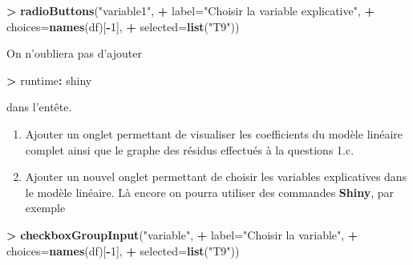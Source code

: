 \documentclass[]{book}
\newenvironment{Shaded}{\begin{snugshade}}{\end{snugshade}}
\newcommand{\DataTypeTok}[1]{\textcolor[rgb]{0.13,0.29,0.53}{#1}}
\newcommand{\DecValTok}[1]{\textcolor[rgb]{0.00,0.00,0.81}{#1}}
\newcommand{\KeywordTok}[1]{\textcolor[rgb]{0.13,0.29,0.53}{\textbf{#1}}}
\newcommand{\NormalTok}[1]{#1}
\newcommand{\OperatorTok}[1]{\textcolor[rgb]{0.81,0.36,0.00}{\textbf{#1}}}
\newcommand{\StringTok}[1]{\textcolor[rgb]{0.31,0.60,0.02}{#1}}
\providecommand{\tightlist}{%
  \setlength{\itemsep}{0pt}\setlength{\parskip}{0pt}}
\theoremstyle{definition}
\theoremstyle{definition}
\theoremstyle{definition}
\theoremstyle{remark}
\begin{document}
\begin{Shaded}
\begin{Highlighting}[]
\OperatorTok{>}\StringTok{ }\KeywordTok{radioButtons}\NormalTok{(}\StringTok{"variable1"}\NormalTok{,}
\OperatorTok{+}\StringTok{                    }\DataTypeTok{label=}\StringTok{"Choisir la variable explicative"}\NormalTok{,}
\OperatorTok{+}\StringTok{                    }\DataTypeTok{choices=}\KeywordTok{names}\NormalTok{(df)[}\OperatorTok{-}\DecValTok{1}\NormalTok{],}
\OperatorTok{+}\StringTok{                    }\DataTypeTok{selected=}\KeywordTok{list}\NormalTok{(}\StringTok{"T9"}\NormalTok{))}
\end{Highlighting}
\end{Shaded}

On n'oubliera pas d'ajouter

\begin{Shaded}
\begin{Highlighting}[]
\OperatorTok{>}\StringTok{ }\NormalTok{runtime}\OperatorTok{:}\StringTok{ }\NormalTok{shiny}
\end{Highlighting}
\end{Shaded}

dans l'entête.

\begin{enumerate}
\def\labelenumi{\alph{enumi}.}
\setcounter{enumi}{2}
\tightlist
\item
  Ajouter un onglet permettant de visualiser les coefficients du modèle linéaire complet ainsi que le graphe des résidus effectués à la questions 1.c.
\item
  Ajouter un nouvel onglet permettant de choisir les variables explicatives dans le modèle linéaire. Là encore on pourra utiliser des commandes \textbf{Shiny}, par exemple
\end{enumerate}

\begin{Shaded}
\begin{Highlighting}[]
\OperatorTok{>}\StringTok{ }\KeywordTok{checkboxGroupInput}\NormalTok{(}\StringTok{"variable"}\NormalTok{,}
\OperatorTok{+}\StringTok{                    }\DataTypeTok{label=}\StringTok{"Choisir la variable"}\NormalTok{,}
\OperatorTok{+}\StringTok{                    }\DataTypeTok{choices=}\KeywordTok{names}\NormalTok{(df)[}\OperatorTok{-}\DecValTok{1}\NormalTok{],}
\OperatorTok{+}\StringTok{                    }\DataTypeTok{selected=}\KeywordTok{list}\NormalTok{(}\StringTok{"T9"}\NormalTok{))}
\end{Highlighting}
\end{Shaded}
\end{document}
